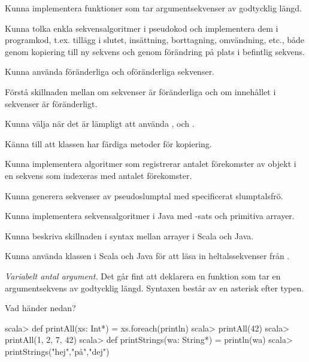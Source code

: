 

\Exercise{\ExeWeekFIVE}\label{exe:W05}

\begin{Goals}
\item Kunna implementera funktioner som tar argumentsekvenser av godtycklig längd.
\item Kunna tolka enkla sekvensalgoritmer i pseudokod och implementera dem i programkod, t.ex. tillägg i slutet, insättning, borttagning, omvändning, etc., både genom kopiering till ny sekvens och genom förändring på plats i befintlig sekvens.  
\item Kunna använda föränderliga och oföränderliga sekvenser.
\item Förstå skillnaden mellan om sekvenser är föränderliga och om innehållet i sekvenser är föränderligt.
\item Kunna välja när det är lämpligt att använda ,  och .
\item Känna till att klassen  har färdiga metoder för kopiering.
\item Kunna implementera algoritmer som registrerar antalet förekomster av objekt i en sekvens som indexeras med antalet förekomster.
\item Kunna generera sekvenser av pseudoslumptal med specificerat slumptalsfrö. 
\item Kunna implementera sekvensalgoritmer i Java med -sats och primitiva arrayer. 
\item Kunna beskriva skillnaden i syntax mellan arrayer i Scala och Java.
\item Kunna använda klassen  i Scala och Java för att läsa in heltalssekvenser från . 
\end{Goals}

\begin{Preparations}
\item {}
\end{Preparations}

\BasicTasks %

\Task \emph{Variabelt antal argument.} Det går fint att deklarera en funktion som tar en argumentsekvens av godtycklig längd. Syntaxen består av en asterisk \code{*} efter typen.

\Subtask Vad händer nedan?
\begin{REPL}
scala> def printAll(xs: Int*) = xs.foreach(println)
scala> printAll(42)
scala> printAll(1, 2, 7, 42)
scala> def printStrings(wa: String*) = println(wa)
scala> printStrings("hej","på","dej")
\end{REPL}

